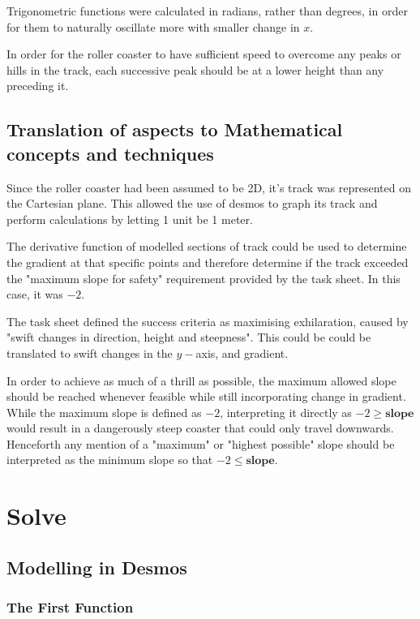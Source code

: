 \documentclass[11pt, letterpaper]{article}
\begin{document}
Trigonometric functions were calculated in radians, rather than degrees, in order for them to naturally oscillate more with smaller change in $x$.

In order for the roller coaster to have sufficient speed to overcome any peaks or hills in the track, each successive peak should be at a lower height than any preceding it.

	




\subsection{Translation of aspects to Mathematical concepts and techniques}

Since the roller coaster had been assumed to be 2D, it's track was represented on the Cartesian plane. This allowed the use of desmos to graph its track and perform calculations by letting 1 unit be 1 meter. 

The derivative function of modelled sections of track could be used to determine the gradient at that specific points and therefore determine if the track exceeded the "maximum slope for safety" requirement provided by the task sheet. In this case, it was $-2$.

The task sheet defined the success criteria as maximising exhilaration, caused by "swift changes in direction, height and steepness". This could be could be translated to swift changes in the $y-$axis, and gradient.

In order to achieve as much of a thrill as possible, the maximum allowed slope should be reached whenever feasible while still incorporating change in gradient.
While the maximum slope is defined as $-2$, interpreting it directly as $-2\geq \textbf{slope}$ would result in a dangerously steep coaster that could only travel downwards. Henceforth any mention of a "maximum" or "highest possible" slope should be interpreted as the minimum slope so that $-2\leq \textbf{slope}$.




\section{Solve}
\subsection{Modelling in Desmos}
\subsubsection{The First Function}
\end{document}
